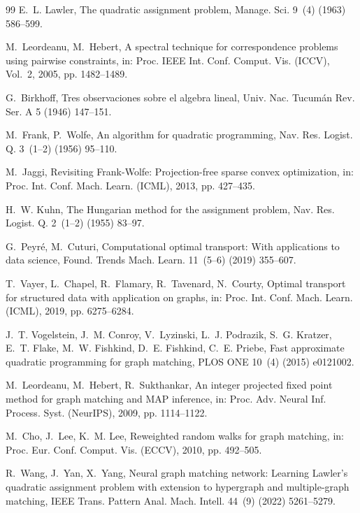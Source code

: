\documentclass[a4paper,fleqn]{cas-dc}
\theoremstyle{thmstyleone}
\theoremstyle{thmstyletwo}
\theoremstyle{thmstylethree}
\begin{document}
\begin{thebibliography}{99}
E.~L. Lawler, The quadratic assignment problem, Manage. Sci. 9~(4) (1963) 586--599.

M.~Leordeanu, M.~Hebert, A spectral technique for correspondence problems using pairwise constraints, in: Proc. IEEE Int. Conf. Comput. Vis. (ICCV), Vol.~2, 2005, pp. 1482--1489.

G.~Birkhoff, Tres observaciones sobre el algebra lineal, Univ. Nac. Tucum\'an Rev. Ser. A 5 (1946) 147--151.

M.~Frank, P.~Wolfe, An algorithm for quadratic programming, Nav. Res. Logist. Q. 3~(1--2) (1956) 95--110.

M.~Jaggi, Revisiting Frank-Wolfe: Projection-free sparse convex optimization, in: Proc. Int. Conf. Mach. Learn. (ICML), 2013, pp. 427--435.

H.~W. Kuhn, The Hungarian method for the assignment problem, Nav. Res. Logist. Q. 2~(1--2) (1955) 83--97.

G.~Peyr{\'e}, M.~Cuturi, Computational optimal transport: With applications to data science, Found. Trends Mach. Learn. 11~(5--6) (2019) 355--607.

T.~Vayer, L.~Chapel, R.~Flamary, R.~Tavenard, N.~Courty, Optimal transport for structured data with application on graphs, in: Proc. Int. Conf. Mach. Learn. (ICML), 2019, pp. 6275--6284.

J.~T. Vogelstein, J.~M. Conroy, V.~Lyzinski, L.~J. Podrazik, S.~G. Kratzer, E.~T. Flake, M.~W. Fishkind, D.~E. Fishkind, C.~E. Priebe, Fast approximate quadratic programming for graph matching, PLOS ONE 10~(4) (2015) e0121002.

M.~Leordeanu, M.~Hebert, R.~Sukthankar, An integer projected fixed point method for graph matching and {MAP} inference, in: Proc. Adv. Neural Inf. Process. Syst. (NeurIPS), 2009, pp. 1114--1122.

\newpage
{}
M.~Cho, J.~Lee, K.~M. Lee, Reweighted random walks for graph matching, in: Proc. Eur. Conf. Comput. Vis. (ECCV), 2010, pp. 492--505.

R.~Wang, J.~Yan, X.~Yang, Neural graph matching network: Learning Lawler's quadratic assignment problem with extension to hypergraph and multiple-graph matching, IEEE Trans. Pattern Anal. Mach. Intell. 44~(9) (2022) 5261--5279.


\end{thebibliography}
\end{document}
